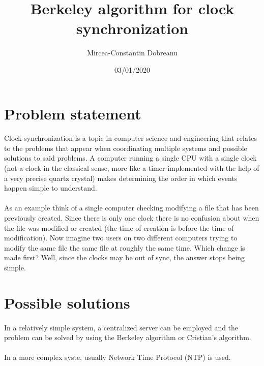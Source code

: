 \documentclass[12pt]{article}
\title{Berkeley algorithm for clock synchronization}
\author{Mircea-Constantin Dobreanu}
\date{03/01/2020}
\begin{document}
\maketitle


\section{Problem statement}

\paragraph{}
Clock synchronization is a topic in computer science and engineering that relates to the problems that appear when coordinating multiple systems and possible solutions to said problems. A computer running a single CPU with a single clock (not a clock in the classical sense, more like a timer implemented with the help of a very precise quartz crystal) makes determining the order in which events happen simple to understand. 
\paragraph{}
As an example think of a single computer checking modifying a file that has been previously created. Since there is only one clock there is no confusion about when the file was modified or created (the time of creation is before the time of modification). Now imagine two users on two different computers trying to modify the same file the same file at roughly the same time. Which change is made first? Well, since the clocks may be out of sync, the answer stops being simple.

\section{Possible solutions}

\paragraph{}
In a relatively simple system, a centralized server can be employed and the problem can be solved by using the Berkeley algorithm or Cristian's algorithm.

\paragraph{}
In a more complex syste, usually Network Time Protocol (NTP) is used.
\end{document}
